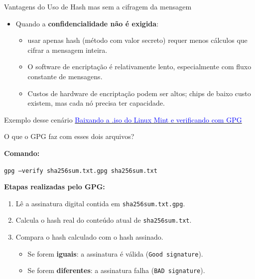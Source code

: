 \begin{frame}{Vantagens do Uso de Hash mas sem a cifragem da mensagem}
    \begin{itemize}
        \item Quando a \textbf{confidencialidade não é exigida}:
              \begin{itemize}
                  \item usar apenas hash (método com valor secreto) requer menos cálculos que cifrar a mensagem inteira.
                  \item O software de encriptação é relativamente lento, especialmente com fluxo constante de mensagens.
                  \item Custos de hardware de encriptação podem ser altos; chips de baixo custo existem, mas cada nó precisa ter capacidade.
              \end{itemize}
    \end{itemize}

    \begin{block}{Exemplo desse cenário}
        \href{https://www.linuxmint.com/edition.php?id=322}{\textcolor{blue}{Baixando a .iso do Linux Mint e verificando com GPG}}

    \end{block}
\end{frame}

\begin{frame}{O que o GPG faz com esses dois arquivos?}

    \textbf{Comando:}
    \begin{block}{}
        \texttt{gpg --verify sha256sum.txt.gpg sha256sum.txt}
    \end{block}

    \textbf{Etapas realizadas pelo GPG:}
    \begin{enumerate}
        \item Lê a assinatura digital contida em \texttt{sha256sum.txt.gpg}.
        \item Calcula o hash real do conteúdo atual de \texttt{sha256sum.txt}.
        \item Compara o hash calculado com o hash assinado.
              \begin{itemize}
                  \item Se forem \textbf{iguais}: a assinatura é válida (\texttt{Good signature}).
                  \item Se forem \textbf{diferentes}: a assinatura falha (\texttt{BAD signature}).
              \end{itemize}
    \end{enumerate}

\end{frame}


